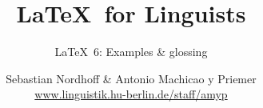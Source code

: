 


\title{
	\LaTeX\ for Linguists
}

\subtitle{\LaTeX\ 6: Examples \& glossing}

\author[aMyP]{
	{\small Sebastian Nordhoff \& Antonio Machicao y Priemer}
	\\
	{\footnotesize \url{www.linguistik.hu-berlin.de/staff/amyp}}
}








\begin{frame}
  \HUtitle
\end{frame}





\nocite{Freitag&MyP15a}
\nocite{Knuth1986}
\nocite{Kopka94a}
\nocite{MyP17c}
	


%
%
%
%
%


